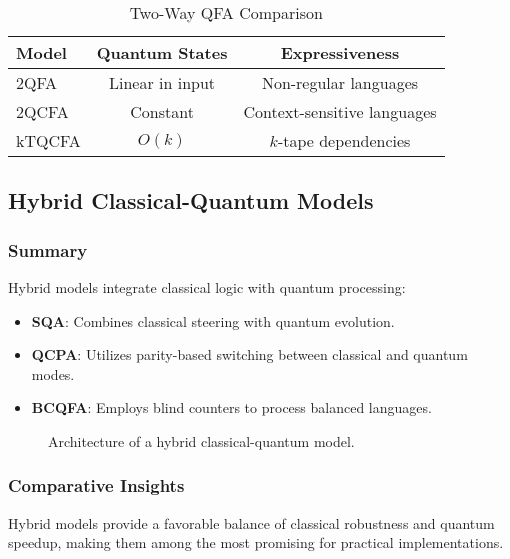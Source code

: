 \begin{table}[ht]
\centering
\caption{Two-Way QFA Comparison}
\label{tab:two_way}
\begin{tabular}{|l|c|c|}
\hline
\textbf{Model} & \textbf{Quantum States} & \textbf{Expressiveness} \\ \hline
2QFA  & Linear in input & Non-regular languages \\ \hline
2QCFA & Constant & Context-sensitive languages \\ \hline
kTQCFA & $O(k)$ & $k$-tape dependencies \\ \hline
\end{tabular}
\end{table}

\subsection*{Hybrid Classical-Quantum Models}

\subsubsection{Summary}
Hybrid models integrate classical logic with quantum processing:
\begin{itemize}
    \item \textbf{SQA}: Combines classical steering with quantum evolution.
    \item \textbf{QCPA}: Utilizes parity-based switching between classical and quantum modes.
    \item \textbf{BCQFA}: Employs blind counters to process balanced languages.
\end{itemize}

\begin{figure}[ht]
\centering
{}
\caption{Architecture of a hybrid classical-quantum model.}
\label{fig:hybrid}
\end{figure}

\subsubsection{Comparative Insights}
Hybrid models provide a favorable balance of classical robustness and quantum speedup, making them among the most promising for practical implementations.


